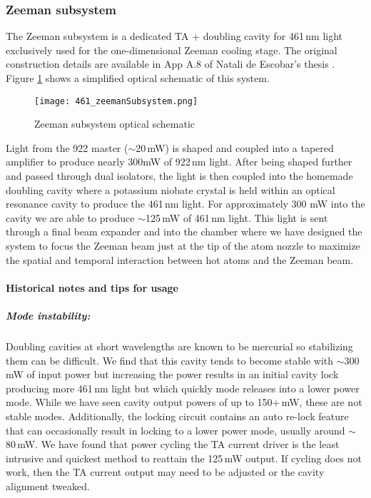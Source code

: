 \subsubsection{Zeeman subsystem}
The Zeeman subsystem is a dedicated TA + doubling cavity for 461\,nm light exclusively used for the one-dimensional Zeeman cooling stage.
The original construction details are available in App A.8 of Natali de Escobar's thesis \cite{MartinezdeEscolar2010}.
Figure \ref{fig:zeemanSchematic} shows a simplified optical schematic of this system.
	\begin{figure} 
		\centerline{
		\texttt{[image: 461\_zeemanSubsystem.png]}}
		\caption{Zeeman subsystem optical schematic}
		\label{fig:zeemanSchematic}
	\end{figure}
Light from the 922 master ($\sim$20\,mW) is shaped and coupled into a tapered amplifier to produce nearly 300\;mW of 922\,nm light.
After being shaped further and passed through dual isolators, the light is then coupled into the homemade doubling cavity where a potassium niobate crystal is held within an optical resonance cavity to produce the 461\,nm light.
For approximately 300 mW into the cavity we are able to produce $\sim$125\,mW of 461\,nm light.
This light is sent through a final beam expander and into the chamber where we have designed the system to focus the Zeeman beam just at the tip of the atom nozzle to maximize the spatial and temporal interaction between hot atoms and the Zeeman beam.

\paragraph{Historical notes and tips for usage}
\subparagraph{Mode instability:} 
Doubling cavities at short wavelengths are known to be mercurial \cite{AaronDSaenz2005} so stabilizing them can be difficult. 
We find that this cavity tends to become stable with $\sim$300\,mW of input power but increasing the power results in an initial cavity lock producing more 461\,nm light but which quickly mode releases into a lower power mode.
While we have seen cavity output powers of up to 150+\,mW, these are not stable modes.
Additionally, the locking circuit contains an auto re-lock feature that can occasionally result in locking to a lower power mode, usually around $\sim$80\,mW.
We have found that power cycling the TA current driver is the least intrusive and quickest method to reattain the 125\,mW output.
If cycling does not work, then the TA current output may need to be adjusted or the cavity alignment tweaked.

